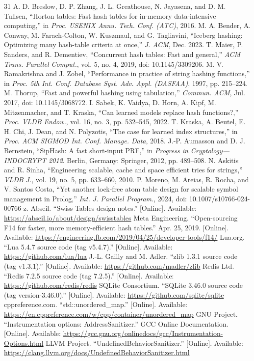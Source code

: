 \documentclass{ieeeaccess}
\begin{document}
\begin{thebibliography}{31}
 A. D. Breslow, D. P. Zhang, J. L. Greathouse, N. Jayasena, and D. M. Tullsen, ``Horton tables: Fast hash tables for in-memory data-intensive computing,'' in \emph{Proc. USENIX Annu. Tech. Conf. (ATC)}, 2016.
 M. A. Bender, A. Conway, M. Farach-Colton, W. Kuszmaul, and G. Tagliavini, ``Iceberg hashing: Optimizing many hash-table criteria at once,'' \emph{J. ACM}, Dec. 2023.
 T. Maier, P. Sanders, and R. Dementiev, ``Concurrent hash tables: Fast and general,'' \emph{ACM Trans. Parallel Comput.}, vol. 5, no. 4, 2019, doi: 10.1145/3309206.
 M. V. Ramakrishna and J. Zobel, ``Performance in practice of string hashing functions,'' in \emph{Proc. 5th Int. Conf. Database Syst. Adv. Appl. (DASFAA)}, 1997, pp. 215--224.
 M. Thorup, ``Fast and powerful hashing using tabulation,'' \emph{Commun. ACM}, Jul. 2017, doi: 10.1145/3068772.
 I. Sabek, K. Vaidya, D. Horn, A. Kipf, M. Mitzenmacher, and T. Kraska, ``Can learned models replace hash functions?,'' \emph{Proc. VLDB Endow.}, vol. 16, no. 3, pp. 532--545, 2022.
 T. Kraska, A. Beutel, E. H. Chi, J. Dean, and N. Polyzotis, ``The case for learned index structures,'' in \emph{Proc. ACM SIGMOD Int. Conf. Manage. Data}, 2018.
 J.-P. Aumasson and D. J. Bernstein, ``SipHash: A fast short-input PRF,'' in \emph{Progress in Cryptology---INDOCRYPT 2012}. Berlin, Germany: Springer, 2012, pp. 489--508.
 N. Askitis and R. Sinha, ``Engineering scalable, cache and space efficient tries for strings,'' \emph{VLDB J.}, vol. 19, no. 5, pp. 633--660, 2010.
 P. Moreno, M. Areias, R. Rocha, and V. Santos Costa, ``Yet another lock-free atom table design for scalable symbol management in Prolog,'' \emph{Int. J. Parallel Program.}, 2024, doi: 10.1007/s10766-024-00766-z.
 Abseil. ``Swiss Tables design notes.'' [Online]. Available: \url{https://abseil.io/about/design/swisstables}
 Meta Engineering. ``Open-sourcing F14 for faster, more memory-efficient hash tables.'' Apr. 25, 2019. [Online]. Available: \url{https://engineering.fb.com/2019/04/25/developer-tools/f14/}
 Lua.org. ``Lua 5.4.7 source code (tag v5.4.7).'' [Online]. Available: \url{https://github.com/lua/lua}
 J.-L. Gailly and M. Adler. ``zlib 1.3.1 source code (tag v1.3.1).'' [Online]. Available: \url{https://github.com/madler/zlib}
 Redis Ltd. ``Redis 7.2.5 source code (tag 7.2.5).'' [Online]. Available: \url{https://github.com/redis/redis}
 SQLite Consortium. ``SQLite 3.46.0 source code (tag version-3.46.0).'' [Online]. Available: \url{https://github.com/sqlite/sqlite}
 cppreference.com. ``std::unordered\_map.'' [Online]. Available: \url{https://en.cppreference.com/w/cpp/container/unordered_map}
 GNU Project. ``Instrumentation options: AddressSanitizer.'' GCC Online Documentation. [Online]. Available: \url{https://gcc.gnu.org/onlinedocs/gcc/Instrumentation-Options.html}
 LLVM Project. ``UndefinedBehaviorSanitizer.'' [Online]. Available: \url{https://clang.llvm.org/docs/UndefinedBehaviorSanitizer.html}
\end{thebibliography}
\end{document}
